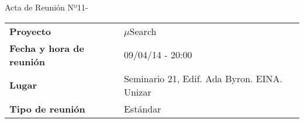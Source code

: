 \begin{center}	
\Large{Acta de Reunión Nº11\hspace{0.25em}-\hspace{0.25em}\tituloReunion}
\end{center}
\vspace{1.5em}

\begin{longtable}{ | L{\tabcolsep} |
				     L{\tabcolsep} | }
\hline %
  \\
\hline %
{\bf Proyecto} & $\mu$Search \\
\hline %
{\bf Fecha y hora de reunión} & 09/04/14 - 20:00 \\
\hline %
{\bf Lugar} & Seminario 21, Edif. Ada Byron. EINA. Unizar \\
\hline %
{\bf Tipo de reunión} & Estándar \\
\hline %
\end{longtable}


